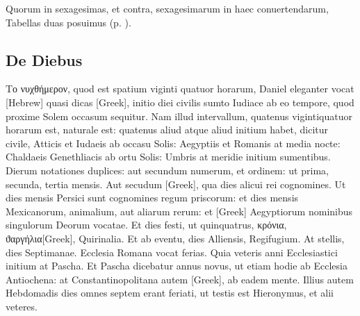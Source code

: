 Quorum in sexagesimas, et
contra, sexagesimarum in haec conuertendarum, Tabellas duas posuimus
 (p. \pageref{tab:convertendi_ostenta}).


\subsection{De Diebus}

\textgreek{Το νυχθήμερον},
quod est spatium viginti quatuor horarum, Daniel
eleganter vocat \texthebrew{[Hebrew]} quasi dicas
\textgreek{[Greek]}, initio diei civilis
sumto Iudiace ab eo tempore, quod proxime Solem occasum
sequitur.
Nam illud intervallum, quatenus vigintiquatuor horarum est,
naturale est: quatenus aliud atque aliud initium habet, dicitur civile,
Atticis et Iudaeis ab occasu Solis: Aegyptiis et Romanis at media nocte:
Chaldaeis Genethliacis ab ortu Solis: Umbris at meridie initium
sumentibus.
Dierum notationes duplices: aut secundum numerum, et
ordinem: ut prima, secunda, tertia mensis.
Aut secudum \textgreek{[Greek]},
qua dies alicui rei cognomines.
Ut dies mensis Persici sunt cognomines
regum priscorum: et dies mensis Mexicanorum, animalium, aut aliarum
rerum: et \textgreek{[Greek]} Aegyptiorum nominibus singulorum Deorum
vocatae.
Et dies festi, ut quinquatrus, \textgreek{κρόνια},
\textgreek{ϑαργήλια[Greek]}, Quirinalia.
Et ab eventu, dies Alliensis, Regifugium.
At stellis, dies Septimanae.
Ecclesia Romana vocat ferias.
Quia veteris anni Ecclesiastici initium
at Pascha.
Et Pascha dicebatur annus novus, ut etiam hodie ab Ecclesia
Antiochena: at Constantinopolitana autem \textgreek{[Greek]},
ab eadem mente.
Illius autem Hebdomadis dies omnes septem erant
feriati, ut testis est Hieronymus, et alii veteres.
